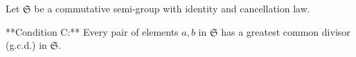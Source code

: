 Let $\mathfrak{S}$ be a commutative semi-group with identity and cancellation law.

**Condition C:** Every pair of elements $a, b$ in $\mathfrak{S}$ has a greatest common divisor (g.c.d.) in $\mathfrak{S}$.

